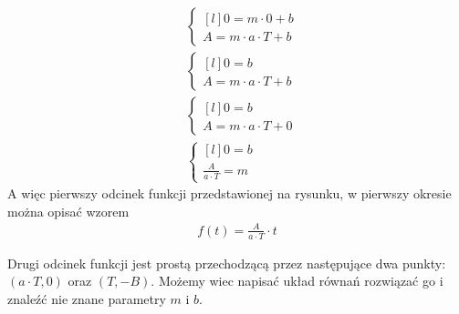 \begin{task}
\begin{align*}
&\left\{\begin{matrix*}[l]
0 = m\cdot 0 +b\\ 
A = m\cdot a \cdot T +b
\end{matrix*}\right. \\
&\left\{\begin{matrix*}[l]
0 = b\\ 
A = m \cdot a\cdot T +b
\end{matrix*}\right. \\
&\left\{\begin{matrix*}[l]
0 = b\\ 
A = m \cdot a\cdot T +0
\end{matrix*}\right. \\
&\left\{\begin{matrix*}[l]
0 = b\\ 
\frac{A}{a\cdot T} = m
\end{matrix*}\right.
\end{align*}
A więc pierwszy odcinek funkcji przedstawionej na rysunku, w pierwszy okresie można opisać wzorem
\begin{align*}
f(t) = \frac{A}{a \cdot T}\cdot t
\end{align*}

Drugi odcinek funkcji jest prostą przechodzącą przez następujące dwa punkty: $(a \cdot T,0)$ oraz $(T,-B)$. Możemy wiec napisać układ równań rozwiązać go i znaleźć nie znane parametry $m$ i $b$.


\end{task}
